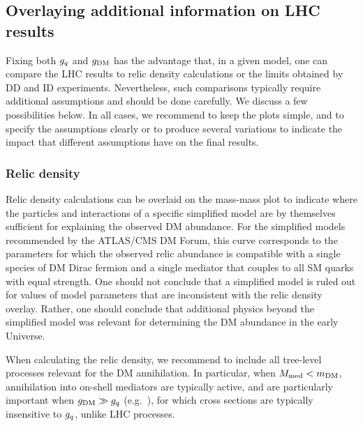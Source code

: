 \subsection{Overlaying additional information on LHC results}
\label{sec:overlayingadditionalinformation}

Fixing both $g_q$ and $g_{\rm{DM}}$ has the advantage that, in a given model, one can compare the LHC results to relic density calculations or the limits obtained by  DD and ID experiments. Nevertheless, such comparisons typically 
require additional assumptions and should be done carefully. We discuss a few possibilities below. In all cases, we recommend to keep the plots simple, and to specify the assumptions clearly or to produce several variations to indicate the impact that different assumptions have on the final results. 

\subsubsection{Relic density}
\label{sub:relicdensity}

Relic density calculations can be overlaid on the mass-mass plot to indicate where the particles and interactions of a specific simplified model are by themselves sufficient for explaining the observed DM abundance.  For the simplified models recommended by the ATLAS/CMS DM Forum, this curve corresponds to the parameters for which the observed relic abundance is compatible with a single species of DM Dirac fermion and a single mediator that couples to all SM quarks with equal strength. One should not conclude that a simplified model is ruled out for values of model parameters that are inconsistent with the relic density overlay. Rather, one should conclude that additional physics beyond the simplified model was relevant for determining the DM abundance in the early Universe. 

When calculating the relic density, we recommend to include all tree-level processes relevant for the DM annihilation.  In particular, when $M_{\rm{med}} < m_{\rm{DM}}$,
annihilation into on-shell mediators are typically active, and are particularly important when $g_{\rm{DM}} \gg g_q$ (e.g.~\cite{Abdullah:2014lla}), for
which cross sections are typically insensitive to $g_q$, unlike LHC processes.

